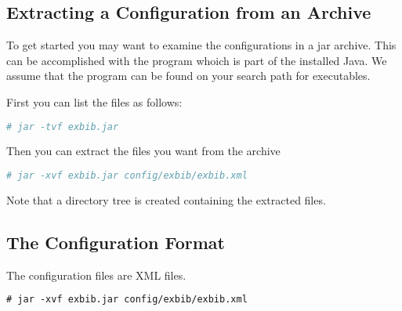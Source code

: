 \subsection{Extracting a Configuration from an Archive}

To get started you may want to examine the configurations in a jar
archive. This can be accomplished with the program  whoich
is part of the installed Java. We assume that the program can be found
on your search path for executables.

First you can list the files as follows:
\begin{lstlisting}[language=sh]
  # jar -tvf exbib.jar
\end{lstlisting}

Then you can extract the files you want from the archive
\begin{lstlisting}[language=sh]
  # jar -xvf exbib.jar config/exbib/exbib.xml
\end{lstlisting}

Note that a directory tree is created containing the extracted files.


\subsection{The Configuration Format}

The configuration files are XML files.

\begin{lstlisting}[language=XML]
  # jar -xvf exbib.jar config/exbib/exbib.xml
\end{lstlisting}


\INCOMPLETE


\endinput
%
